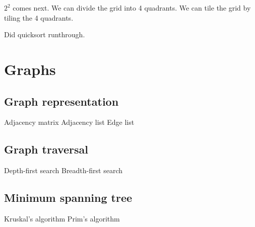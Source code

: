\documentclass{article}
\begin{document}
$ 2^2 $ comes next. We can divide the grid into 4 quadrants. We can tile the grid by tiling the 4 quadrants.

Did quicksort runthrough.

\section{Graphs}

\subsection{Graph representation}

\begin{outline}
    \1 Adjacency matrix
    \1 Adjacency list
    \1 Edge list
\end{outline}

\subsection{Graph traversal}

\begin{outline}
    \1 Depth-first search
    \1 Breadth-first search
\end{outline}

\subsection{Minimum spanning tree}

\begin{outline}
    \1 Kruskal's algorithm
    \1 Prim's algorithm
\end{outline}
\end{document}
